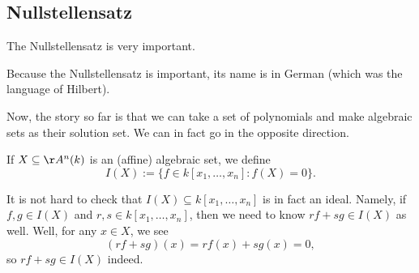 \documentclass[../notes.tex]{subfiles}
\begin{document}
\subsection{Nullstellensatz}
The Nullstellensatz is very important.
\begin{remark}
	Because the Nullstellensatz is important, its name is in German (which was the language of Hilbert).
\end{remark}

Now, the story so far is that we can take a set of polynomials and make algebraic sets as their solution set. We can in fact go in the opposite direction.
\begin{defihelper}[\texorpdfstring{$I(X)$}{I(X)}] 
	If $X\subseteq\AA^n(k)$ is an (affine) algebraic set, we define
	\[I(X):=\{f\in k[x_1,\ldots,x_n]:f(X)=0\}.\]
\end{defihelper}
It is not hard to check that $I(X)\subseteq k[x_1,\ldots,x_n]$ is in fact an ideal. Namely, if $f,g\in I(X)$ and $r,s\in k[x_1,\ldots,x_n]$, then we need to know $rf+sg\in I(X)$ as well. Well, for any $x\in X$, we see
\[(rf+sg)(x)=rf(x)+sg(x)=0,\]
so $rf+sg\in I(X)$ indeed.
\end{document}
